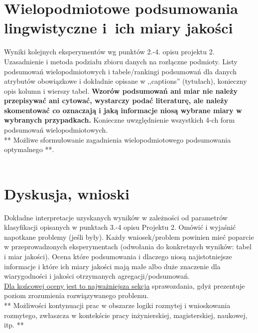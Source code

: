\documentclass{article}
\begin{document}
\section{Wielopodmiotowe podsumowania lingwistyczne i~ich miary jakości} 
Wyniki kolejnych eksperymentów wg punktów 2.-4. opisu projektu 2. Uzasadnienie i
metoda podziału zbioru danych na rozłączne podmioty. Listy podsumowań
wielopodmiotowych i tabele/rankingi podsumowań dla danych atrybutów obowiązkowe i
dokładnie opisane w ,,captions'' (tytułach), konieczny opis kolumn i wierszy tabel.
{\bf Wzorów podsumowań ani miar nie należy przepisywać ani cytować, wystarczy podać literaturę, ale
należy skomentować co oznaczają i jaką informacje niosą wybrane miary w wybranych
przypadkach.} Konieczne uwzględnienie wszystkich 4-ch form podsumowań wielopodmiotowych. 
\\ 

** Możliwe sformułowanie zagadnienia wielopodmiotowego podsumowania optymalnego **.\\
\\



\section{Dyskusja, wnioski}
Dokładne interpretacje uzyskanych wyników w zależności od parametrów klasyfikacji
opisanych w punktach 3.-4 opisu Projektu 2. 
Omówić i wyjaśnić napotkane problemy (jeśli były). Każdy wniosek/problem powinien mieć poparcie
w przeprowadzonych eksperymentach (odwołania do konkretnych wyników: tabel i miar
jakości). Ocena które podsumowania i dlaczego niosą najistotniejsze informacje
i które ich miary jakości mają małe albo duże znaczenie dla wiarygodności i jakości otrzymanych
agregacji/podsumowań.  \\
\underline{Dla końcowej oceny jest to najważniejsza sekcja} sprawozdania, gdyż prezentuje poziom
zrozumienia rozwiązywanego problemu.\\

** Możliwości kontynuacji prac w obszarze logiki rozmytej i wnioskowania rozmytego, zwłaszcza w kontekście pracy inżynierskiej,
magisterskiej, naukowej, itp. **\\

\end{document}
